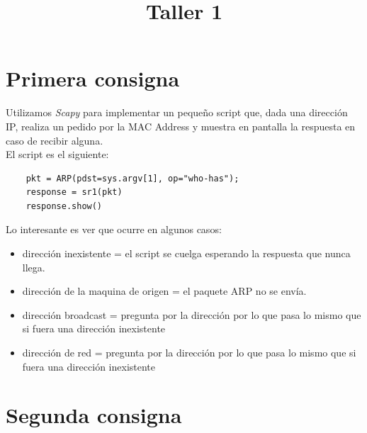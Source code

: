 \documentclass[a4paper]{article}
\title{Taller 1}
\begin{document}


\maketitle

\newpage

\tableofcontents


\newpage

\section{Primera consigna}

Utilizamos \textit{Scapy} para implementar un pequeño script que, dada una dirección IP, realiza un pedido por la MAC Address y muestra en pantalla la respuesta en caso de recibir alguna.\\

El script es el siguiente:

\begin{verbatim}
	pkt = ARP(pdst=sys.argv[1], op="who-has");
	response = sr1(pkt)
	response.show()
\end{verbatim}


Lo interesante es ver que ocurre en algunos casos:

\begin{itemize}
\item dirección inexistente = el script se cuelga esperando la respuesta que nunca llega. 
\item dirección de la maquina de origen = el paquete ARP no se envía.
\item dirección broadcast = pregunta por la dirección por lo que pasa lo mismo que si fuera una dirección inexistente 
\item dirección de red = pregunta por la dirección por lo que pasa lo mismo que si fuera una dirección inexistente 
\end{itemize}


\section{Segunda consigna}
\end{document}
